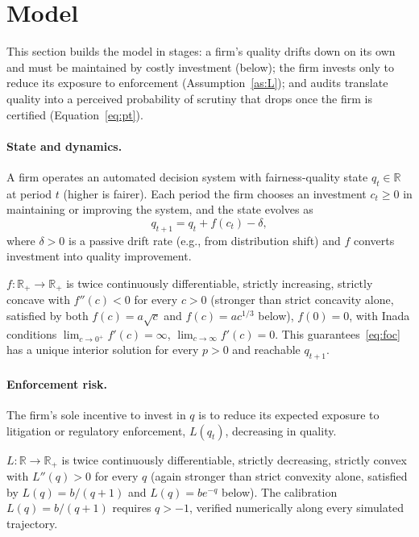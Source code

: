 \section{Model}
\label{sec:model}

This section builds the model in stages: a firm's quality drifts down on its own and must be maintained by costly investment (below); the firm invests only to reduce its exposure to enforcement (Assumption~\ref{as:L}); and audits translate quality into a perceived probability of scrutiny that drops once the firm is certified (Equation~\ref{eq:pt}).

\paragraph{State and dynamics.} A firm operates an automated decision system with fairness-quality state $q_t \in \mathbb{R}$ at period $t$ (higher is fairer). Each period the firm chooses an investment $c_t \geq 0$ in maintaining or improving the system, and the state evolves as
\begin{equation}
q_{t+1} = q_t + f(c_t) - \delta,
\label{eq:dynamics}
\end{equation}
where $\delta > 0$ is a passive drift rate (e.g., from distribution shift) and $f$ converts investment into quality improvement.

\begin{assumption}
$f: \mathbb{R}_+ \to \mathbb{R}_+$ is twice continuously differentiable, strictly increasing, strictly concave with $f''(c)<0$ for every $c>0$ (stronger than strict concavity alone, satisfied by both $f(c)=a\sqrt{c}$ and $f(c)=ac^{1/3}$ below), $f(0)=0$, with Inada conditions $\lim_{c\to0^+}f'(c)=\infty$, $\lim_{c\to\infty}f'(c)=0$. This guarantees~\eqref{eq:foc} has a unique interior solution for every $p>0$ and reachable $q_{t+1}$.
\label{as:f}
\end{assumption}

\paragraph{Enforcement risk.} The firm's sole incentive to invest in $q$ is to reduce its expected exposure to litigation or regulatory enforcement, $L(q_t)$, decreasing in quality.

\begin{assumption}
$L: \mathbb{R} \to \mathbb{R}_+$ is twice continuously differentiable, strictly decreasing, strictly convex with $L''(q)>0$ for every $q$ (again stronger than strict convexity alone, satisfied by $L(q)=b/(q+1)$ and $L(q)=be^{-q}$ below). The calibration $L(q)=b/(q+1)$ requires $q>-1$, verified numerically along every simulated trajectory.
\label{as:L}
\end{assumption}

